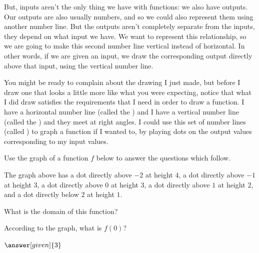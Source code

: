 \documentclass{ximera}
\begin{document}
But, inputs aren't the only thing we have with functions: we also have outputs. Our outputs are also usually numbers, and so we could also represent them using another number line. But the outputs aren't completely separate from the inputs, they depend on what input we have. We want to represent this relationship, so we are going to make this second number line vertical instead of horizontal. In other words, if we are given an input, we draw the corresponding output directly above that input, using the vertical number line.
\begin{image}
\end{image}
You might be ready to complain about the drawing I just made, but before I draw one that looks a little more like what you were expecting, notice that what I did draw satisfies the requirements that I need in order to draw a function. I have a horizontal number line (called the ) and I have a vertical number line (called the ) and they meet at right angles. I could use this set of number lines (called ) to graph a function if I wanted to, by playing dots on the output values corresponding to my input values.
\begin{question}
Use the graph of a function $f$ below to answer the questions which follow.
\begin{image}
\end{image}

The graph above has a dot directly above $-2$ at height $4$, a dot directly above $-1$ at height $3$, a dot directly above $0$ at height $3$, a dot directly above $1$ at height $2$, and a dot directly below $2$ at height $1$.

What is the domain of this function?
\begin{multipleChoice}
\end{multipleChoice}

According to the graph, what is $f(0)$?
\begin{prompt}
$\answer[given]{3}$
\end{prompt}
\end{question}
\end{document}

